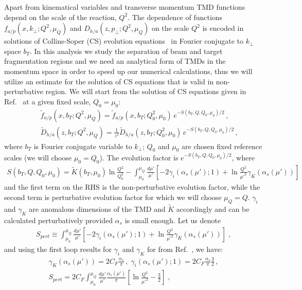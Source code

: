\documentclass[final,3p,times,onecolumn,sort&compress,hidelinks]{elsarticle}
\newcommand\3[1]{\boldsymbol{#1}}
\begin{document}
Apart from kinematical variables and transverse momentum TMD functions depend on the scale of the reaction, $Q^2$.
The dependence of functions $f_{a/p} (x, k_{\perp}; Q^2, \mu_Q)$ and $D_{h/a}(z, p_{\perp}; Q^2, \mu_Q)$  on the scale $Q^2$ is encoded in solutions of Collins-Soper (CS) evolution equations~\cite{Collins:2011zzd} in Fourier conjugate to $k_{\perp}$ space $b_T$. In this analysis we study the separation of beam and target fragmentation regions and we need an analytical form of TMDs in the momentum space in order to speed up our numerical calculations, thus we will utilize an estimate for the solution of CS equations that is valid in non-perturbative region. We will start from the solution of CS equations given in Ref.~\cite{Collins:2014jpa} at a given fixed scale, $Q_0=\mu_0$:
\begin{eqnarray}
&&\tilde f_{a/p} (x,b_T; Q^2, \mu_Q)= \tilde f_{a/p} (x, b_T; Q_0^2, \mu_0)\,e^{-S(b_T, Q, Q_0, \mu_0)/2}\,,
\label{e:PDF_ansatz}\\[0.3cm]
&&\tilde D_{h/a}(z,b_T; Q^2, \mu_Q)=\frac{1}{z^2}\tilde D_{h/a}(z, b_T; Q_0^2, \mu_0)\,e^{-S(b_T, Q, Q_0, \mu_0)/2}\,,
\label{e:FF_ansatz0}
\end{eqnarray}
where $b_T$ is Fourier conjugate variable to $k_\perp$; $Q_0$ and $\mu_0$ are chosen fixed reference scales (we will choose $\mu_0 = Q_0$). The evolution factor is $e^{-S(b_T, Q, Q_0, \mu_0)/2}$, where
\begin{eqnarray}
S(b_T, Q, Q_0, \mu_0) = \tilde K(b_T,\mu_0) \ln\frac{Q^2}{Q_0^2} - \int_{\mu_0}^{\mu_Q} \frac{d \mu'}{\mu'}\left[
-2 \gamma_i(\alpha_s(\mu');1) +\ln\frac{Q^2}{\mu'^2}\gamma_K(\alpha_s(\mu'))
 \right]
 \label{e:FF_ansatz}
\end{eqnarray}
and the first term on the RHS is the non-perturbative evolution factor, while the second term is perturbative evolution factor for which we will choose $\mu_Q = Q$. $\gamma_i$ and $\gamma_K$ are anomalous dimensions of the TMD and $\tilde K$ accordingly and can be calculated perturbatively provided $\alpha_s$ is small enough.
Let us denote
\begin{eqnarray}
S_{pert} \equiv \int_{\mu_0}^{\mu_Q} \frac{d \mu'}{\mu'}\left[
-2 \gamma_i(\alpha_s(\mu');1) +\ln\frac{Q^2}{\mu'^2}\gamma_K(\alpha_s(\mu'))
 \right] \; ,
 \label{e:FF_Spert}
\end{eqnarray}
and using the first loop results for $\gamma_i$ and $\gamma_K$ for from Ref.~\cite{Aybat:2011zv}, we have:
\begin{eqnarray}
\gamma_K(\alpha_s(\mu')) = 2 C_F \frac{\alpha_s}{\pi} \, ,  \;
\gamma_i(\alpha_s(\mu');1) = 2 C_F \frac{\alpha_s}{\pi} \frac{3}{2} \, ,\\
S_{pert} = 2 C_F \int_{\mu_0}^{\mu_Q} \frac{d \mu'}{\mu'} \frac{\alpha_s(\mu')}{\pi} \left[\ln\frac{Q^2}{\mu'^2} - \frac{3}{2}
 \right] \; ,
 \label{e:FF_Spert1}
\end{eqnarray}
\end{document}
